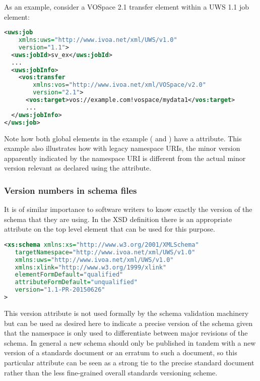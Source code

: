 \documentclass[10pt,a4paper]{ivoa}
\begin{document}
As an example, consider a VOSpace 2.1 transfer element within a UWS 1.1
job element:

\begin{lstlisting}[language=xml]
<uws:job
    xmlns:uws="http://www.ivoa.net/xml/UWS/v1.0"
    version="1.1">
  <uws:jobId>sv_ex</uws:jobId>
  ...
  <uws:jobInfo>
    <vos:transfer
        xmlns:vos="http://www.ivoa.net/xml/VOSpace/v2.0"
        version="2.1">
      <vos:target>vos://example.com!vospace/mydata1</vos:target>
      ...
  </uws:jobInfo>
</uws:job>
\end{lstlisting}

Note how both global elements in the example ( and
) have a  attribute.  This example
also illustrates how with legacy namespace URIs, the minor version
apparently indicated by the namespace URI is different from the actual
minor version relevant as declared using the  attribute.


\subsubsection{Version numbers in schema files}
It is of similar importance to software writers to know exactly the version of
the schema that they are using. In the XSD definition there is an appropriate
 attribute on the top level  element that can be
used for this purpose.

\begin{lstlisting}[language=XML]
<xs:schema xmlns:xs="http://www.w3.org/2001/XMLSchema"
   targetNamespace="http://www.ivoa.net/xml/UWS/v1.0"
   xmlns:uws="http://www.ivoa.net/xml/UWS/v1.0"
   xmlns:xlink="http://www.w3.org/1999/xlink"
   elementFormDefault="qualified"
   attributeFormDefault="unqualified"
   version="1.1-PR-20150626"
>
\end{lstlisting}

This version attribute is not used formally by the schema validation machinery
but can be used as desired here to indicate a precise version of the schema
given that the namespace is only used to differentiate between major revisions
of the schema. In general a new schema should only be published in tandem with a
new version of a standards document or an erratum to such a document, so this
particular  attribute can be seen as a strong tie to the precise
standard document rather than the less fine-grained overall standards versioning
scheme.
\end{document}
